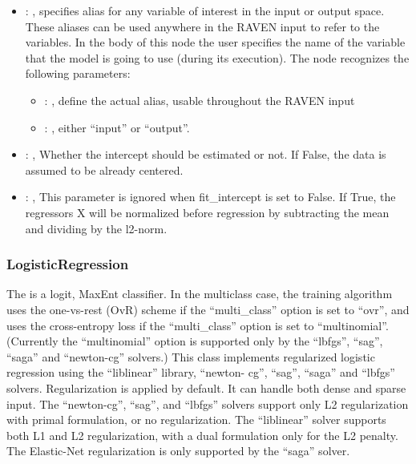 \begin{itemize}
    \item {}: , 
      specifies alias for         any variable of interest in the input or output space. These
      aliases can be used anywhere in the RAVEN input to         refer to the variables. In the body
      of this node the user specifies the name of the variable that the model is going to use
      (during its execution).
      The  node recognizes the following parameters:
        \begin{itemize}
          \item {}: , 
            define the actual alias, usable throughout the RAVEN input
          \item {}: , 
            either ``input'' or ``output''.
      \end{itemize}

    \item {}: , 
      Whether the intercept should be estimated or not. If False,
      the data is assumed to be already centered.

    \item {}: , 
      This parameter is ignored when fit\_intercept is set to False. If True,
      the regressors X will be normalized before regression by subtracting the mean and
      dividing by the l2-norm.
  \end{itemize}


\subsubsection{LogisticRegression}
  The   is                             a logit, MaxEnt classifier.
  In the multiclass case, the training algorithm uses the one-vs-rest (OvR) scheme
  if the ``multi\_class'' option is set to ``ovr'', and uses the cross-entropy loss if the
  ``multi\_class'' option is set to ``multinomial''. (Currently the ``multinomial'' option
  is supported only by the ``lbfgs'', ``sag'', ``saga'' and ``newton-cg'' solvers.)
  This class implements regularized logistic regression using the ``liblinear'' library, ``newton-
  cg'',                             ``sag'', ``saga'' and ``lbfgs'' solvers. Regularization is
  applied by default. It can handle both dense and sparse input.                             The
  ``newton-cg'', ``sag'', and ``lbfgs'' solvers support only L2 regularization with primal
  formulation,                             or no regularization. The ``liblinear'' solver supports
  both L1 and L2 regularization, with a dual formulation                             only for the L2
  penalty. The Elastic-Net regularization is only supported by the ``saga'' solver.

